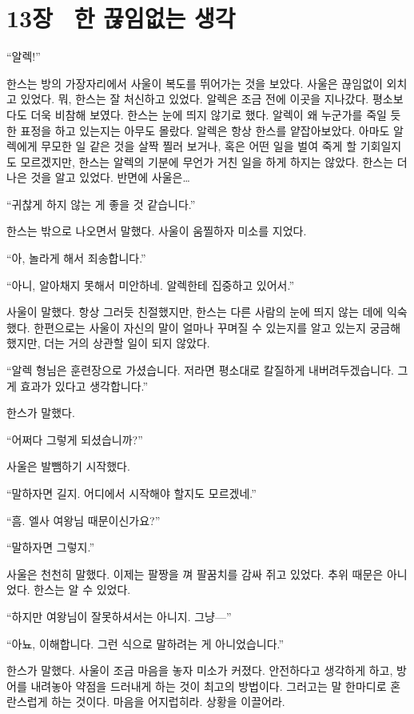 \chapter[13장  한 끊임없는 생각][13장\hspace*{.5em}한 끊임없는 생각]{13장 \ 한 끊임없는 생각}



\forceindent``알렉!''

한스는 방의 가장자리에서 사울이 복도를 뛰어가는 것을 보았다. 사울은 끊임없이 외치고 있었다. 뭐, 한스는 잘 처신하고 있었다. 알렉은 조금 전에 이곳을 지나갔다. 평소보다도 더욱 비참해 보였다. 한스는 눈에 띄지 않기로 했다. 알렉이 왜 누군가를 죽일 듯한 표정을 하고 있는지는 아무도 몰랐다. 알렉은 항상 한스를 얕잡아보았다. 아마도 알렉에게 무모한 일 같은 것을 살짝 찔러 보거나, 혹은 어떤 일을 벌여 죽게 할 기회일지도 모르겠지만, 한스는 알렉의 기분에 무언가 거친 일을 하게 하지는 않았다. 한스는 더 나은 것을 알고 있었다. 반면에 사울은\ldots

``귀찮게 하지 않는 게 좋을 것 같습니다.''

한스는 밖으로 나오면서 말했다. 사울이 움찔하자 미소를 지었다.

``아, 놀라게 해서 죄송합니다.''

``아니, 알아채지 못해서 미안하네. 알렉한테 집중하고 있어서.''

사울이 말했다. 항상 그러듯 친절했지만, 한스는 다른 사람의 눈에 띄지 않는 데에 익숙했다. 한편으로는 사울이 자신의 말이 얼마나 꾸며질 수 있는지를 알고 있는지 궁금해했지만, 더는 거의 상관할 일이 되지 않았다.

``알렉 형님은 훈련장으로 가셨습니다. 저라면 평소대로 칼질하게 내버려두겠습니다. 그게 효과가 있다고 생각합니다.''

한스가 말했다.

``어쩌다 그렇게 되셨습니까?''

사울은 발뺌하기 시작했다.

``말하자면 길지. 어디에서 시작해야 할지도 모르겠네.''

``흠. 엘사 여왕님 때문이신가요?''

``말하자면 그렇지.''

사울은 천천히 말했다. 이제는 팔짱을 껴 팔꿈치를 감싸 쥐고 있었다. 추위 때문은 아니었다. 한스는 알 수 있었다.

``하지만 여왕님이 잘못하셔서는 아니지. 그냥—''

``아뇨, 이해합니다. 그런 식으로 말하려는 게 아니었습니다.''

한스가 말했다. 사울이 조금 마음을 놓자 미소가 커졌다. 안전하다고 생각하게 하고, 방어를 내려놓아 약점을 드러내게 하는 것이 최고의 방법이다. 그러고는 말 한마디로 혼란스럽게 하는 것이다. 마음을 어지럽히라. 상황을 이끌어라.

